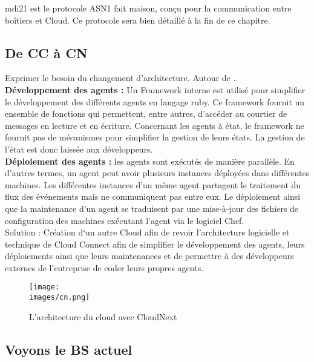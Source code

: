         \gls{mdi21} est le protocole  ASN1 fait maison, conçu pour la communication entre boîtiers et Cloud.
        Ce protocole sera bien détaillé à la fin de ce chapitre.

    
    \subsection{De \gls{CC} à \gls{CN}}
        Exprimer le besoin du changement d'architecture. 
        Autour de .. \\
        \textbf{Développement des agents :} Un Framework interne est utilisé pour simplifier le développement des différents 
        agents en langage ruby. Ce framework fournit un ensemble de fonctions qui permettent, entre autres, d’accéder au 
        courtier de messages en lecture et en écriture. Concernant les agents à état, le framework ne fournit pas 
        de mécanismes pour simplifier la gestion de leurs états. La gestion de l’état est donc laissée aux développeurs.\\[0.3cm]
        \textbf{Déploiement des agents :} les agents sont exécutés de manière parallèle. En d’autres termes, un agent peut avoir 
        plusieurs instances déployées dans différentes machines. Les différentes instances d’un même agent partagent 
        le traitement du flux des événements mais ne communiquent pas entre eux. Le déploiement ainsi que la maintenance 
        d’un agent se traduisent par une mise-à-jour des fichiers de configuration des machines exécutant l’agent via le logiciel Chef.\\ [0.3cm]

        Solution :  Création d‘un autre Cloud afin de revoir l’architecture logicielle et technique de Cloud 
        Connect afin de simplifier le développement des agents, leurs déploiements ainsi que leurs maintenances et 
        de permettre à des développeurs externes de l’entreprise de coder leurs propres agents.



        \begin{figure}[ht]
            \centering
            \texttt{[image: \\images/cn.png]}
            \caption{L'architecture du cloud avec CloudNext}
        \end{figure}

        \vspace{0.2cm}

       \break

       

        \subsection{Voyons le BS actuel}

